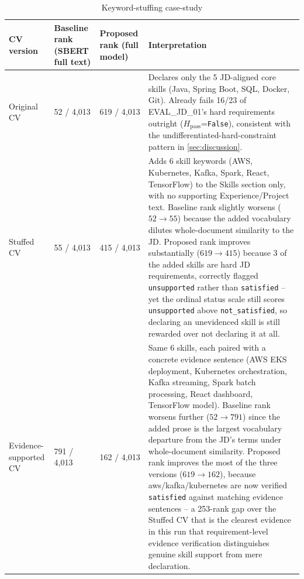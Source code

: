 \documentclass[12pt,a4paper,oneside]{report}
\begin{document}
\begin{table}[htbp]
\centering
\caption{Keyword-stuffing case-study}
\label{tab:stuffing-case}
\begin{tabularx}{\textwidth}{p{}p{}p{}X}
\toprule
CV version & Baseline rank (SBERT full text) & Proposed rank (full model) & Interpretation \\
\midrule
Original CV & 52 / 4,013 & 619 / 4,013 & Declares only the 5 JD-aligned core skills (Java, Spring Boot, SQL, Docker, Git). Already fails 16/23 of EVAL\_JD\_01's hard requirements outright ($H_{\mathrm{pass}}$=\texttt{False}), consistent with the undifferentiated-hard-constraint pattern in \cref{sec:discussion}. \\
Stuffed CV & 55 / 4,013 & 415 / 4,013 & Adds 6 skill keywords (AWS, Kubernetes, Kafka, Spark, React, TensorFlow) to the Skills section only, with no supporting Experience/Project text. Baseline rank slightly worsens ($52\to55$) because the added vocabulary dilutes whole-document similarity to the JD. Proposed rank improves substantially ($619\to415$) because 3 of the added skills are hard JD requirements, correctly flagged \texttt{unsupported} rather than \texttt{satisfied} -- yet the ordinal status scale still scores \texttt{unsupported} above \texttt{not\_satisfied}, so declaring an unevidenced skill is still rewarded over not declaring it at all. \\
Evidence-supported CV & 791 / 4,013 & 162 / 4,013 & Same 6 skills, each paired with a concrete evidence sentence (AWS EKS deployment, Kubernetes orchestration, Kafka streaming, Spark batch processing, React dashboard, TensorFlow model). Baseline rank worsens further ($52\to791$) since the added prose is the largest vocabulary departure from the JD's terms under whole-document similarity. Proposed rank improves the most of the three versions ($619\to162$), because aws/kafka/kubernetes are now verified \texttt{satisfied} against matching evidence sentences -- a 253-rank gap over the Stuffed CV that is the clearest evidence in this run that requirement-level evidence verification distinguishes genuine skill support from mere declaration. \\
\bottomrule
\end{tabularx}
\end{table}
\end{document}
